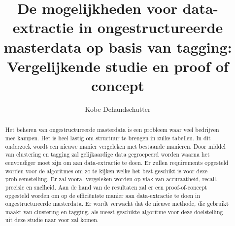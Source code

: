 \documentclass{hogent-article}
\title{De mogelijkheden voor data-extractie in ongestructureerde masterdata op basis van tagging: Vergelijkende studie en proof of concept}
\author{Kobe Dehandschutter}
\begin{document}
\begin{abstract}

  Het beheren van ongestructureerde masterdata is een probleem waar veel bedrijven mee kampen. Het is heel lastig om structuur te brengen in zulke tabellen. In dit onderzoek wordt een nieuwe manier vergeleken met bestaande manieren. Door middel van clustering en tagging zal gelijkaardige data gegroepeerd worden waarna het eenvoudiger moet zijn om aan data-extractie te doen. Er zullen requirements opgesteld worden voor de algoritmes om zo te kijken welke het best geschikt is voor deze probleemstelling. Er zal vooral vergeleken worden op vlak van accuraatheid, recall, precisie en snelheid. Aan de hand van de resultaten zal er een proof-of-concept opgesteld worden om op de efficiëntste manier aan data-extractie te doen in ongestructureerde masterdata. Er wordt verwacht dat de nieuwe methode, die gebruikt maakt van clustering en tagging, als meest geschikte algoritme voor deze doelstelling uit deze studie naar voor zal komen.

\end{abstract}


\tableofcontents


\printbibliography[heading=bibintoc]
\end{document}
